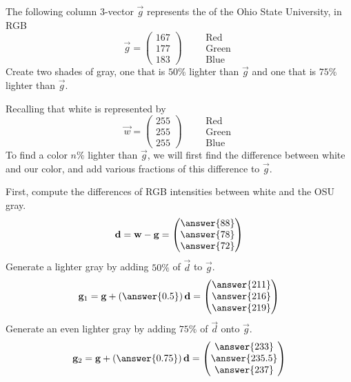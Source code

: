 \documentclass{ximera}
\author{Tae Eun Kim}
\begin{document}
\begin{exercise}
  The following column $3$-vector $\vec{g}$ represents the
  of the Ohio State University, in RGB 
  \[
    \vec{g} = \begin{pmatrix}
      167\\ 177\\ 183
    \end{pmatrix}
    \qquad
    \begin{array}{l}
      \text{Red}\\
      \text{Green}\\
      \text{Blue}
    \end{array}
    \]
    Create two shades of gray, one that is $50\%$ lighter than
    $\vec{g}$ and one that is $75\%$ lighter than $\vec{g}$.
    \begin{prompt}
      Recalling that white is represented by
      \[
      \vec{w} = \begin{pmatrix}
        255\\ 255\\ 255
      \end{pmatrix}
      \qquad
      \begin{array}{l}
        \text{Red}\\
        \text{Green}\\
        \text{Blue}
      \end{array}
      \]
      To find a color $n\%$ lighter than $\vec{g}$, we will first find
      the difference between white and our color, and add various
      fractions of this difference to $\vec{g}$.

      
      First, compute the differences of RGB intensities between white and the OSU
      gray.
      \[
      \vec{d} = \vec{w} - \vec{g} =
      \begin{pmatrix}
        \answer{88}\\
        \answer{78}\\
        \answer{72}
      \end{pmatrix}
      \]
      Generate a lighter gray by adding $50\%$ of $\vec{d}$ to $\vec{g}$.
      \[
      \vec{g}_1 = \vec{g} + \left(\answer{0.5}\right)\vec{d} =
      \begin{pmatrix}
        \answer{211}\\
        \answer{216}\\
        \answer{219}
      \end{pmatrix}
      \]
      Generate an even lighter gray by adding $75\%$ of $\vec{d}$
      onto $\vec{g}$.
  \[
    \vec{g}_2 = \vec{g} + \left(\answer{0.75}\right)\vec{d} =
    \begin{pmatrix}
      \answer{233}\\
      \answer{235.5}\\
      \answer{237}
    \end{pmatrix}
    \]
    

\end{prompt}
\end{exercise}
\end{document}
